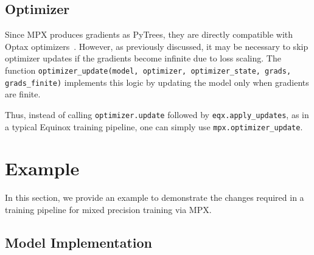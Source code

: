 \documentclass[10pt, a4paper, logo, onecolumn, internal, copyright]{dsme}
\newcommand{\mpx}{\textsc{MPX}}
\begin{document}
\subsection{Optimizer}
\label{sec:optimizer}

Since \mpx{} produces gradients as PyTrees, they are directly compatible with Optax optimizers~\cite{deepmind2020jax}.
However, as previously discussed, it may be necessary to skip optimizer updates if the gradients become infinite due to loss scaling. 
The function \texttt{optimizer\_update(model, optimizer, optimizer\_state, grads, grads\_finite)} implements this logic by updating the model only when gradients are finite.

Thus, instead of calling \texttt{optimizer.update} followed by \texttt{eqx.apply\_updates}, as in a typical Equinox training pipeline, one can simply use \texttt{mpx.optimizer\_update}.


\section{Example}
In this section, we provide an example to demonstrate the changes required in a training pipeline for mixed precision training via \mpx{}.

\subsection{Model Implementation}
\end{document}
